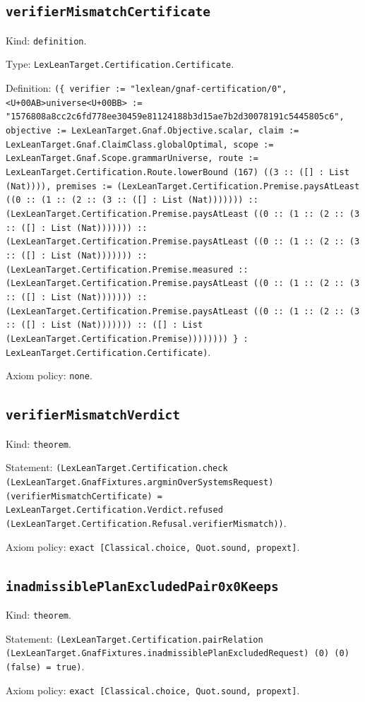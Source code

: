 \documentclass[11pt]{article}
\begin{document}
\subsection*{\texttt{verifierMismatchCertificate}}
\noindent Kind: \texttt{definition}.\par
\noindent Type: \texttt{LexLeanTarget.Certification.Certificate}.\par
\noindent Definition: \texttt{(\{ verifier := "lexlean/gnaf-certification/0", <U+00AB>universe<U+00BB> := "1576808a8cc2c6fd778ee30459e81124188b3d15ae7b2d30078191c5445805c6", objective := LexLeanTarget.Gnaf.Objective.scalar, claim := LexLeanTarget.Gnaf.ClaimClass.globalOptimal, scope := LexLeanTarget.Gnaf.Scope.grammarUniverse, route := LexLeanTarget.Certification.Route.lowerBound (167) ((3 :: ([] : List (Nat)))), premises := (LexLeanTarget.Certification.Premise.paysAtLeast ((0 :: (1 :: (2 :: (3 :: ([] : List (Nat))))))) :: (LexLeanTarget.Certification.Premise.paysAtLeast ((0 :: (1 :: (2 :: (3 :: ([] : List (Nat))))))) :: (LexLeanTarget.Certification.Premise.paysAtLeast ((0 :: (1 :: (2 :: (3 :: ([] : List (Nat))))))) :: (LexLeanTarget.Certification.Premise.measured :: (LexLeanTarget.Certification.Premise.paysAtLeast ((0 :: (1 :: (2 :: (3 :: ([] : List (Nat))))))) :: (LexLeanTarget.Certification.Premise.paysAtLeast ((0 :: (1 :: (2 :: (3 :: ([] : List (Nat))))))) :: ([] : List (LexLeanTarget.Certification.Premise)))))))) \} : LexLeanTarget.Certification.Certificate)}.\par
\noindent Axiom policy: \texttt{none}.\par
\subsection*{\texttt{verifierMismatchVerdict}}
\noindent Kind: \texttt{theorem}.\par
\noindent Statement: \texttt{(LexLeanTarget.Certification.check (LexLeanTarget.GnafFixtures.argminOverSystemsRequest) (verifierMismatchCertificate) = LexLeanTarget.Certification.Verdict.refused (LexLeanTarget.Certification.Refusal.verifierMismatch))}.\par
\noindent Axiom policy: \texttt{exact [Classical.choice, Quot.sound, propext]}.\par
\subsection*{\texttt{inadmissiblePlanExcludedPair0x0Keeps}}
\noindent Kind: \texttt{theorem}.\par
\noindent Statement: \texttt{(LexLeanTarget.Certification.pairRelation (LexLeanTarget.GnafFixtures.inadmissiblePlanExcludedRequest) (0) (0) (false) = true)}.\par
\noindent Axiom policy: \texttt{exact [Classical.choice, Quot.sound, propext]}.\par
\end{document}
